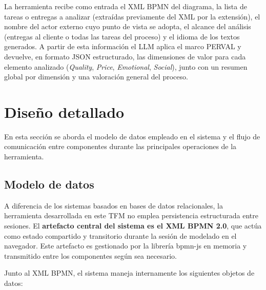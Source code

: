 La herramienta recibe como entrada el XML BPMN del diagrama, la lista de tareas o entregas a analizar (extraídas previamente del XML por la extensión), el nombre del actor externo cuyo punto de vista se adopta, el alcance del análisis (entregas al cliente o todas las tareas del proceso) y el idioma de los textos generados. A partir de esta información el LLM aplica el marco PERVAL y devuelve, en formato JSON estructurado, las dimensiones de valor para cada elemento analizado (\textit{Quality}, \textit{Price}, \textit{Emotional}, \textit{Social}), junto con un resumen global por dimensión y una valoración general del proceso.

\section{Diseño detallado}
\label{sec:disenioDetallado}

En esta sección se aborda el modelo de datos empleado en el sistema y el flujo de comunicación entre componentes durante las principales operaciones de la herramienta.

\subsection{Modelo de datos}

A diferencia de los sistemas basados en bases de datos relacionales, la herramienta desarrollada en este TFM no emplea persistencia estructurada entre sesiones. El \textbf{artefacto central del sistema es el XML BPMN 2.0}, que actúa como estado compartido y transitorio durante la sesión de modelado en el navegador. Este artefacto es gestionado por la librería bpmn-js en memoria y transmitido entre los componentes según sea necesario.

Junto al XML BPMN, el sistema maneja internamente los siguientes objetos de datos:

